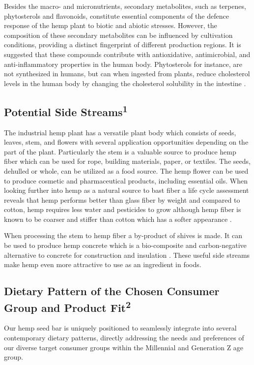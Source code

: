 \vspace{1em}
Besides the macro- and micronutrients, secondary metabolites, such as terpenes, phytosterols and flavonoids, constitute essential components of the defence response of the hemp plant to biotic and abiotic stresses. However, the composition of these secondary metabolites can be influenced by cultivation conditions, providing a distinct fingerprint of different production regions. It is suggested that these compounds contribute with antioxidative, antimicrobial, and anti-inflammatory properties in the human body. Phytosterols for instance, are not synthesized in humans, but can when ingested from plants, reduce cholesterol levels in the human body by changing the cholesterol solubility in the intestine \cite*{art_21_hemp_review}.

\subsection{Potential Side Streams\textsuperscript{1}}
The industrial hemp plant has a versatile plant body which consists of seeds, leaves, stem, and flowers with several application opportunities depending on the part of the plant. Particularly the stem is a valuable source to produce hemp fiber which can be used for rope, building materials, paper, or textiles. The seeds, dehulled or whole, can be utilized as a food source. The hemp flower can be used to produce cosmetic and pharmaceutical products, including essential oils. When looking further into hemp as a natural source to bast fiber a life cycle assessment reveals that hemp performs better than glass fiber by weight and compared to cotton, hemp requires less water and pesticides to grow although hemp fiber is known to be coarser and stiffer than cotton which has a softer appearance \cite*{Kaur2023SustainabilityIndustrialHemp}. 

\vspace{1em}
When processing the stem to hemp fiber a by-product of shives is made. It can be used to produce hemp concrete which is a bio-composite and carbon-negative alternative to concrete for construction and insulation \cite*{Yano2023HempSustainableFoods}. These useful side streams make hemp even more attractive to use as an ingredient in foods. 

\subsection{Dietary Pattern of the Chosen Consumer Group and Product Fit\textsuperscript{2}}
Our hemp seed bar is uniquely positioned to seamlessly integrate into several contemporary dietary patterns, directly addressing the needs and preferences of our diverse target consumer groups within the Millennial and Generation Z age group.

